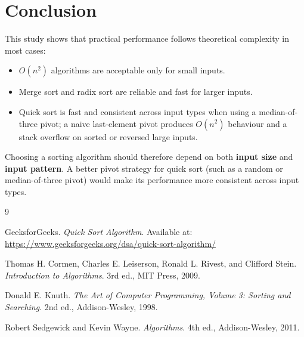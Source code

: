 \documentclass[11pt,a4paper]{article}
\begin{document}
\section{Conclusion}
This study shows that practical performance follows theoretical complexity in most cases:
\begin{itemize}
    \item \(O(n^2)\) algorithms are acceptable only for small inputs.
    \item Merge sort and radix sort are reliable and fast for larger inputs.
    \item Quick sort is fast and consistent across input types when using a median-of-three pivot; a naive last-element pivot produces \(O(n^2)\) behaviour and a stack overflow on sorted or reversed large inputs.
\end{itemize}

Choosing a sorting algorithm should therefore depend on both \textbf{input size} and \textbf{input pattern}. A better pivot strategy for quick sort (such as a random or median-of-three pivot) would make its performance more consistent across input types.

\begin{thebibliography}{9}

GeeksforGeeks.
\textit{Quick Sort Algorithm}.
Available at: \url{https://www.geeksforgeeks.org/dsa/quick-sort-algorithm/}

Thomas H. Cormen, Charles E. Leiserson, Ronald L. Rivest, and Clifford Stein.
\textit{Introduction to Algorithms}.
3rd ed., MIT Press, 2009.

Donald E. Knuth.
\textit{The Art of Computer Programming, Volume 3: Sorting and Searching}.
2nd ed., Addison-Wesley, 1998.

Robert Sedgewick and Kevin Wayne.
\textit{Algorithms}.
4th ed., Addison-Wesley, 2011.

\end{thebibliography}
\end{document}
